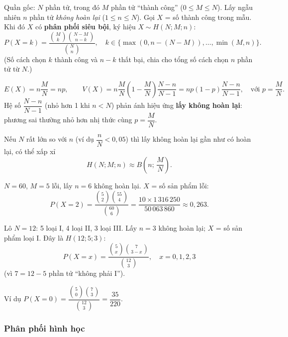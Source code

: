 \documentclass[12pt,a4paper]{article}
\begin{document}
\begin{dinhnghia}
  Quần gốc: $N$ phần tử, trong đó $M$ phần tử ``thành công'' ($0 \le M \le N$). Lấy ngẫu nhiên $n$ phần tử \emph{không hoàn lại} ($1 \le n \le N$). Gọi $X$ = số thành công trong mẫu. Khi đó $X$ có \textbf{phân phối siêu bội}, ký hiệu $X \sim H(N; M; n)$:
  \[
    P(X = k) = \dfrac{\binom{M}{k}\binom{N-M}{n-k}}{\binom{N}{n}},
    \quad k \in \{\max(0,n-(N-M)),\ldots,\min(M,n)\}.
  \]
  (Số cách chọn $k$ thành công và $n-k$ thất bại, chia cho tổng số cách chọn $n$ phần tử từ $N$.)
\end{dinhnghia}

\begin{dinhly}
  \[
    E(X) = n\dfrac{M}{N} = np, \qquad
    V(X) = n\dfrac{M}{N}\left(1 - \dfrac{M}{N}\right)\dfrac{N-n}{N-1} = np(1-p)\dfrac{N-n}{N-1}, \quad \text{với } p = \dfrac{M}{N}.
  \]
  Hệ số $\dfrac{N-n}{N-1}$ (nhỏ hơn 1 khi $n < N$) phản ánh hiệu ứng \textbf{lấy không hoàn lại}: phương sai thường nhỏ hơn nhị thức cùng $p = \dfrac{M}{N}$.
\end{dinhly}

\begin{luuy}[title={Nhị thức $\approx$ siêu bội khi $N$ lớn}]
Nếu $N$ rất lớn so với $n$ (ví dụ $\dfrac{n}{N} < 0{,}05$) thì lấy không hoàn lại gần như có hoàn lại, có thể xấp xỉ
\[
  H(N;M;n) \approx B\!\left(n;\, \dfrac{M}{N}\right).
\]
\end{luuy}

\begin{vidu}[title={Lô 60 sản phẩm, 5 lỗi, lấy 6}]
$N = 60$, $M = 5$ lỗi, lấy $n = 6$ không hoàn lại. $X$ = số sản phẩm lỗi:
\[
  P(X = 2) = \dfrac{\binom{5}{2}\binom{55}{4}}{\binom{60}{6}} = \dfrac{10 \times 1\,316\,250}{50\,063\,860} \approx 0{,}263.
\]
\end{vidu}

\begin{vidu}[title={Lô ba loại -- chỉ đếm loại I}]
Lô $N = 12$: 5 loại I, 4 loại II, 3 loại III. Lấy $n = 3$ không hoàn lại; $X$ = số sản phẩm loại I. Đây là $H(12; 5; 3)$:
\[
  P(X = x) = \dfrac{\binom{5}{x}\binom{7}{3-x}}{\binom{12}{3}}, \quad x = 0,1,2,3
\]
(vì $7 = 12 - 5$ phần tử ``không phải I''). 

Ví dụ $P(X = 0) = \dfrac{\binom{5}{0}\binom{7}{3}}{\binom{12}{3}} = \dfrac{35}{220}$.
\end{vidu}

\subsubsection{Phân phối hình học}
\end{document}
